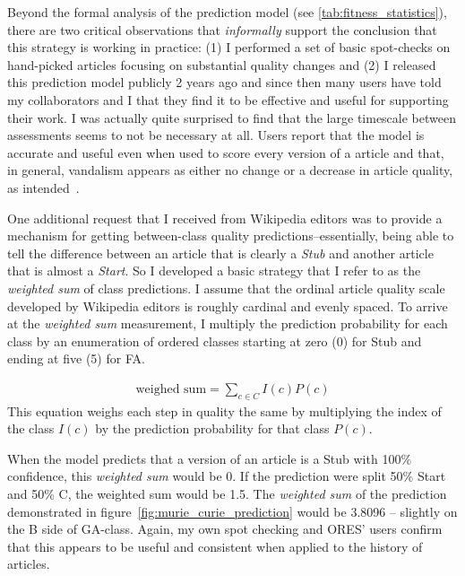 Beyond the formal analysis of the prediction model (see \ref{tab:fitness_statistics}), there are two critical observations that \emph{informally} support the conclusion that this strategy is working in practice:  (1) I performed a set of basic spot-checks on hand-picked articles focusing on substantial quality changes and (2) I released this prediction model publicly 2 years ago and since then many users have told my collaborators and I that they find it to be effective and useful for supporting their work.  I was actually quite surprised to find that the large timescale between assessments seems to not be necessary at all.  Users report that the model is accurate and useful even when used to score every version of a article and that, in general, vandalism appears as either no change or a decrease in article quality, as intended~\cite{ross2016visualizaing}.

One additional request that I received from Wikipedia editors was to provide a mechanism for getting between-class quality predictions--essentially, being able to tell the difference between an article that is clearly a \emph{Stub} and another article that is almost a \emph{Start}.  So I developed a basic strategy that I refer to as the \emph{weighted sum} of class predictions.  I assume that the ordinal article quality scale developed by Wikipedia editors is roughly cardinal and evenly spaced.  To arrive at the \emph{weighted sum} measurement, I multiply the prediction probability for each class by an enumeration of ordered classes starting at zero (0) for Stub and ending at five (5) for FA.

\begin{equation} \label{eq:weighted_sum}
\begin{split}
\text{weighed sum} = \sum_{c \in C}{I(c)P(c)}
\end{split}
\end{equation}
This equation weighs each step in quality the same by multiplying the index of the class $I(c)$ by the prediction probability for that class $P(c)$.

When the model predicts that a version of an article is a Stub with 100\% confidence, this \emph{weighted sum} would be 0.  If the prediction were split 50\% Start and 50\% C, the weighted sum would be 1.5.  The \emph{weighted sum} of the prediction demonstrated in figure~\ref{fig:murie_curie_prediction} would be 3.8096 -- slightly on the B side of GA-class.  Again, my own spot checking and ORES' users confirm that this appears to be useful and consistent when applied to the history of articles.

